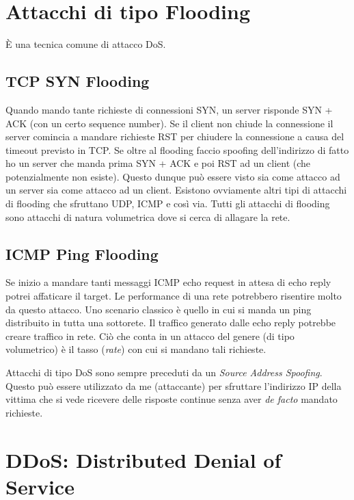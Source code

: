 \documentclass[14pt]{extreport}
\begin{document}
\section{Attacchi di tipo Flooding}
È una tecnica comune di attacco DoS. 


\subsection{TCP SYN Flooding}
Quando mando tante richieste di connessioni SYN, un server risponde SYN + ACK (con un certo sequence number). Se il client non chiude la connessione il server comincia a mandare richieste RST per chiudere la connessione a causa del timeout previsto in TCP. Se oltre al flooding faccio spoofing dell'indirizzo di fatto ho un server che manda prima SYN + ACK e poi RST ad un client (che potenzialmente non esiste). Questo dunque può essere visto sia come attacco ad un server sia come attacco ad un client.\newline
Esistono ovviamente altri tipi di attacchi di flooding che sfruttano UDP, ICMP e così via. Tutti gli attacchi di flooding sono attacchi di natura volumetrica dove si cerca di allagare la rete.


\subsection{ICMP Ping Flooding}
Se inizio a mandare tanti messaggi ICMP echo request in attesa di echo reply potrei affaticare il target. Le performance di una rete potrebbero risentire molto da questo attacco. Uno scenario classico è quello in cui si manda un ping distribuito in tutta una sottorete. Il traffico generato dalle echo reply potrebbe creare traffico in rete.
Ciò che conta in un attacco del genere (di tipo volumetrico) è il tasso (\textit{rate}) con cui si mandano tali richieste.

Attacchi di tipo DoS sono sempre preceduti da un \textit{Source Address Spoofing}. Questo può essere utilizzato da me (attaccante) per sfruttare l'indirizzo IP della vittima che si vede ricevere delle risposte continue senza aver \textit{de facto} mandato richieste.







\section{DDoS: Distributed Denial of Service}
\end{document}
